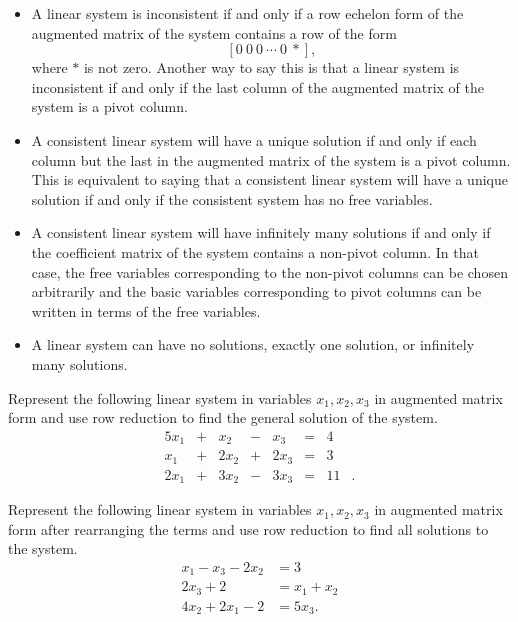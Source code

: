\begin{itemize}
	\begin{itemize}
	\item A linear system is inconsistent if and only if a row echelon form of the augmented matrix of the system contains a row of the form
    \[[0 \ 0 \ 0 \ \cdots \ 0 \ *],\]
    where $*$ is not zero. Another way to say this is that a linear system is inconsistent if and only if the last column of the augmented matrix of the system is a pivot column.
	\item A consistent linear system will have a unique solution if and only if each column but the last in the augmented matrix of the system is a pivot column. This is equivalent to saying that a consistent linear system will have a unique solution if and only if the consistent system has no free variables.
	\item A consistent linear system will have infinitely many solutions if and only if the coefficient matrix of the system contains a non-pivot column. In that case, the free variables corresponding to the non-pivot columns can be chosen arbitrarily and the basic variables corresponding to pivot columns can be written in terms of the free variables.
	\item A linear system can have no solutions, exactly one solution, or infinitely many solutions.
	\end{itemize}  
\end{itemize}




\be
\item Represent the following linear system in variables $x_1, x_2, x_3$ in augmented matrix form and use row reduction to find the general solution of the system.
\begin{alignat*}{5}
{}x_1 	&{}+{}	&{}x_2	&{}-{}	&{}x_3 	&= &{}4&{} \\
{}x_1	&{}+{}	&{2}x_2 &{}+{}	&{2}x_3 &= &{}3&{}\\
{2}x_1	&{}+{}	&{3}x_2 &{}-{}	&{3}x_3 &= &{}11&{.}
\end{alignat*}

\item Represent the following linear system in variables $x_1, x_2, x_3$ in augmented matrix form after rearranging the terms and use row reduction to find all solutions to the system. %
\begin{align*}
x_1 - x_3 - 2x_2 &= 3 \\
2x_3 + 2 &= x_1 +x_2\\
4x_2 + 2x_1 - 2 &= 5x_3.
\end{align*}

